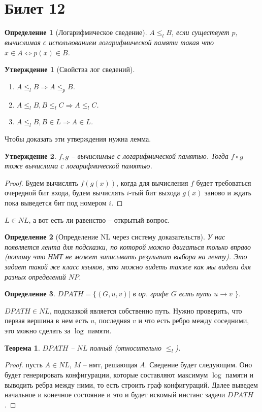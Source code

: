 \documentclass[12pt, letterpaper]{article}
\newtheorem{theorem}{Теорема}[section]
\newtheorem{prop}{Утверждение}[section]
\newtheorem{defi}{Определение}[section]
\newcommand{\leqp}{\leq_{p}}
\newcommand{\leql}{\leq_{l}}
\begin{document}
\section{Билет 12}
\begin{defi}[Логарифмическое сведение]
$A \leql B$, если существует $p$, вычислимая с использованием логарифмической памяти такая что $x \in A \Longleftrightarrow p(x) \in B$.
\end{defi}

\begin{prop}[Свойства лог сведений]
\begin{enumerate}
\item $A \leql B \Rightarrow A \leqp B$.
\item $A \leql B, B \leql C \Rightarrow A \leql C$.
\item $A \leql B, B \in L \Rightarrow A \in L$.
\end{enumerate}
\end{prop}
Чтобы доказать эти утверждения нужна лемма.
\begin{prop}
$f, g$ -- вычислимые с логарифмической памятью. Тогда $f \circ g$ тоже вычислима с логарифмической памятью. 
\end{prop}
\begin{proof}
Будем вычислять $f(g(x))$, когда для вычисления $f$ будет требоваться очередной бит входа, будем вычислять $i$-тый бит выхода $g(x)$ заново и ждать пока выведется бит под номером $i$. 
\end{proof}
$L \in NL$, а вот есть ли равенство -- открытый вопрос.
\begin{defi}[Определение NL через систему доказательств]
У нас появляется лента для подсказки, по которой можно двигаться только вправо (потому что НМТ не может записывать результат выбора на ленту). Это задает такой же класс языков, это можно видеть также как мы видели для разных определений $NP$.
\end{defi}
\begin{defi}
$DPATH = \{(G, u, v) |$ в ор. графе $G$ есть путь $u \rightarrow v$ $\}$. 
\end{defi}
$DPATH \in NL$, подсказкой является собственно путь. Нужно проверить, что первая вершина в нем есть $u$, последняя $v$ и что есть ребро между соседними, это можно сделать за $\log$ памяти.

\begin{theorem}
$DPATH$ -- $NL$ полный (относительно $\leql$).
\end{theorem}
\begin{proof}
пусть $A \in NL$, $M$ -- нмт, решающая $A$. Сведение будет следующим. Оно будет генерировать конфигурации, которые составляют максимум $\log$ памяти и выводить ребра между ними, то есть строить граф конфигураций. Далее выведем начальное и конечное состояние и это и будет искомый инстанс задачи $DPATH$.
\end{proof}
\end{document}
